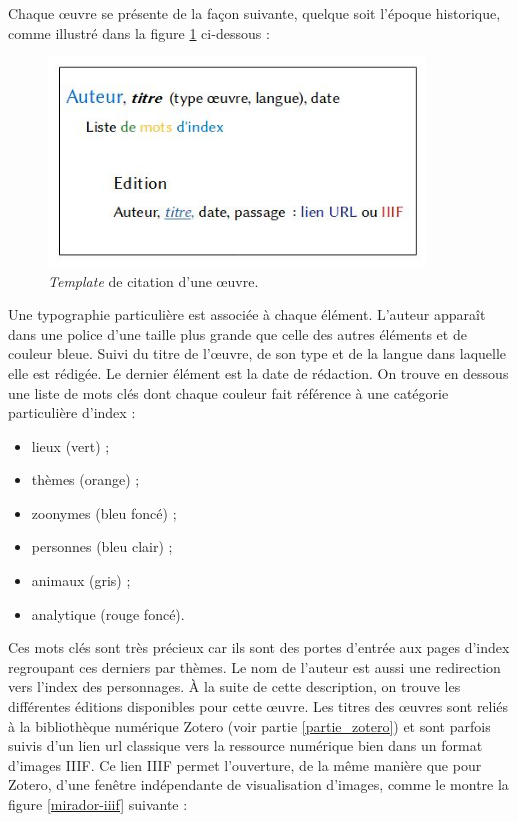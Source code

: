 \documentclass[a4paper,12pt,twoside]{book}
\begin{document}
Chaque \oe{}uvre se présente de la façon suivante, quelque soit l'époque historique, comme illustré dans la figure \ref{template} ci-dessous : 

\begin{figure}[H]
    \centering
    \includegraphics[width=10cm]{img/partie_3/template.JPG}
    \caption{\textit{Template} de citation d'une \oe{}uvre.}
    \label{template}
\end{figure}

Une typographie particulière est associée à chaque élément. L'auteur apparaît dans une police d'une taille plus grande que celle des autres éléments et de couleur bleue. Suivi du titre de l'\oe{}uvre, de son type et de la langue dans laquelle elle est rédigée. Le dernier élément est la date de rédaction. On trouve en dessous une liste de mots clés dont chaque couleur fait référence à une catégorie particulière d'index : 
\begin{itemize}
    \item lieux (vert) ;
    \item thèmes (orange) ;
    \item zoonymes (bleu foncé) ;
    \item personnes (bleu clair) ;
    \item animaux (gris) ;
    \item analytique (rouge foncé).
\end{itemize}
Ces mots clés sont très précieux car ils sont des portes d'entrée aux pages d'index regroupant ces derniers par thèmes. Le nom de l'auteur est aussi une redirection vers l'index des personnages. À la suite de cette description, on trouve les différentes éditions disponibles pour cette \oe{}uvre. Les titres des \oe{}uvres sont reliés à la bibliothèque numérique Zotero (voir partie \ref{partie_zotero}) et sont parfois suivis d'un lien url classique vers la ressource numérique bien dans un format d'images \acrshort{IIIF}. Ce lien \acrshort{IIIF} permet l'ouverture, de la même manière que pour Zotero, d'une fenêtre indépendante de visualisation d'images, comme le montre la figure \ref{mirador-iiif} suivante :
\end{document}
